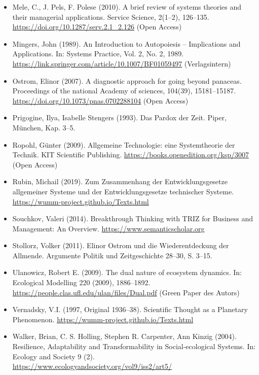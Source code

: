 \documentclass[11pt,a4paper]{article}
\begin{document}
\begin{itemize}
\item Mele, C., J. Pels, F. Polese (2010). A brief review of systems theories
  and their managerial applications. Service Science, 2(1--2), 126--135.\\
  \url{https://doi.org/10.1287/serv.2.1_2.126} (Open Access)
\item Mingers, John (1989). An Introduction to Autopoiesis -- Implications and
  Applications. In: Systems Practice, Vol. 2, No. 2, 1989.\\
  \url{https://link.springer.com/article/10.1007/BF01059497} (Verlagsintern) 
\item Ostrom, Elinor (2007). A diagnostic approach for going beyond panaceas.
  Proceedings of the national Academy of sciences, 104(39), 15181--15187.\\
  \url{https://doi.org/10.1073/pnas.0702288104} (Open Access)
\item Prigogine, Ilya, Isabelle Stengers (1993). Das Pardox der Zeit. Piper,
  München, Kap. 3--5.  
\item Ropohl, Günter (2009). Allgemeine Technologie: eine Systemtheorie der
  Technik.  KIT Scientific Publishing.
  \url{https://books.openedition.org/ksp/3007} (Open Access) 
\item Rubin, Michail (2019).  Zum Zusammenhang der Entwicklungsgesetze
  allgemeiner Systeme und der Entwicklungsgesetze technischer Systeme. \\
  \url{https://wumm-project.github.io/Texts.html} 
\item Souchkov, Valeri (2014). Breakthrough Thinking with TRIZ for Business
  and Management: An Overview. \url{https://www.semanticscholar.org}
\item Stollorz, Volker (2011). Elinor Ostrom und die Wiederentdeckung der
  Allmende. Argumente Politik und Zeitgeschichte 28--30, S. 3--15. 
\item Ulanowicz, Robert E. (2009). The dual nature of ecosystem dynamics.
  In: Ecological Modelling 220 (2009), 1886–1892.\\
  \url{https://people.clas.ufl.edu/ulan/files/Dual.pdf} (Green Paper des
  Autors) 
\item Vernadsky, V.I. (1997, Original 1936--38). Scientific Thought as a
  Planetary Phenomenon. \url{https://wumm-project.github.io/Texts.html}
\item Walker, Brian, C. S. Holling, Stephen R. Carpenter, Ann Kinzig (2004).
  Resilience, Adaptability and Transformability in Social-ecological Systems. 
  In: Ecology and Society 9 (2).
  \url{https://www.ecologyandsociety.org/vol9/iss2/art5/}
\end{itemize}
\end{document}
